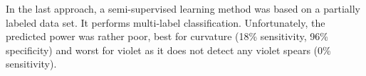\bigskip
In the last approach, a semi-supervised learning method was based on a partially labeled data set. It performs multi-label classification. Unfortunately, the predicted power was rather poor, best for curvature (18\% sensitivity, 96\% specificity) and worst for violet as it does not detect any violet spears (0\% sensitivity).